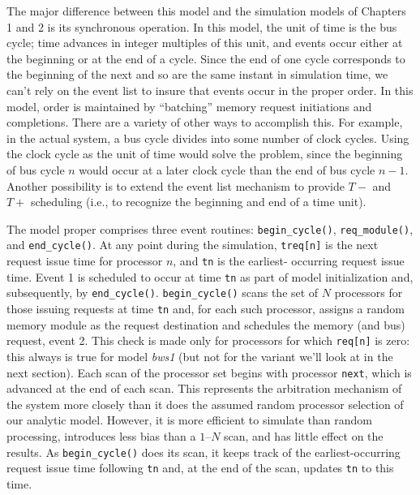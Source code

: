 The major difference between this model and the simulation models of
Chapters 1 and 2 is its synchronous operation. In this model, the unit of time
is the bus cycle; time advances in integer multiples of this unit, and events
occur either at the beginning or at the end of a cycle. Since the end of one
cycle corresponds to the beginning of the next and so are the same instant in
simulation time, we can't rely on the event list to insure that events occur in
the proper order. In this model, order is maintained by ``batching'' memory
request initiations and completions. There are a variety of other ways to
accomplish this. For example, in the actual system, a bus cycle divides into
some number of clock cycles. Using the clock cycle as the unit of time would
solve the problem, since the beginning of bus cycle $n$ would occur at a later
clock cycle than the end of bus cycle $n-1$. Another possibility is to extend the
event list mechanism to provide $T-$ and $T+$ scheduling (i.e., to recognize the
beginning and end of a time unit).

The model proper comprises three event routines:\newline
\texttt{begin\_cycle()},
\texttt{req\_module()}, and \texttt{end\_cycle()}. At any point during the simulation,
\texttt{treq[n]} is the next request issue time for processor $n$, and \texttt{tn} is the earliest-
occurring request issue time. Event 1 is scheduled to occur at time \texttt{tn} as part of
model initialization and, subsequently, by \texttt{end\_cycle()}. \texttt{begin\_cycle()}
scans the set of $N$ processors for those issuing requests at time \texttt{tn} and, for each
such processor, assigns a random memory module as the request destination
and schedules the memory (and bus) request, event 2. This check is made only
for processors for which \texttt{req[n]} is zero: this always is true for model \emph{bws1}
(but not for the variant we'll look at in the next section). Each scan of the
processor set begins with processor \texttt{next}, which is advanced at the end of
each scan. This represents the arbitration mechanism of the system more
closely than it does the assumed random processor selection of our analytic
model. However, it is more efficient to simulate than random processing,
introduces less bias than a $1$--$N$ scan, and has little effect on the results. As
\texttt{begin\_cycle()} does its scan, it keeps track of the earliest-occurring request
issue time following \texttt{tn} and, at the end of the scan, updates \texttt{tn} to this time.

